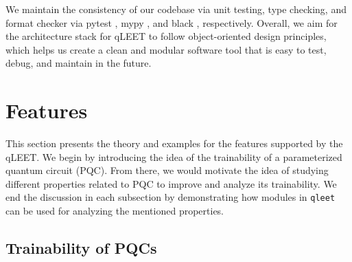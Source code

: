 We maintain the consistency of our codebase via unit testing, type checking, and format checker via pytest \cite{pytestx.y}, mypy \cite{mypy}, and black \cite{black}, respectively. Overall, we aim for the architecture stack for qLEET to follow object-oriented design principles, which helps us create a clean and modular software tool that is easy to test, debug, and maintain in the future. 



\section{\label{sec:features}Features}

This section presents the theory and examples for the features supported by the qLEET. We begin by introducing the idea of the trainability of a parameterized quantum circuit (PQC). From there, we would motivate the idea of studying different properties related to PQC to improve and analyze its trainability. We end the discussion in each subsection by demonstrating how modules in \texttt{qleet} can be used for analyzing the mentioned properties. 

\subsection{\label{sec:training}Trainability of PQCs}

